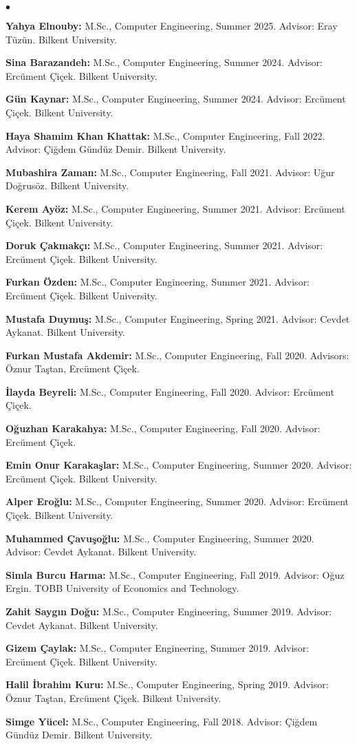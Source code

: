 \documentclass[margin,line]{res}
\newenvironment{list2}{
  \begin{list}{$\bullet$}{%
      \setlength{\itemsep}{0.1cm}
      \setlength{\parsep}{0in} \setlength{\parskip}{0in}
      \setlength{\topsep}{0in} \setlength{\partopsep}{0in} 
      \setlength{\leftmargin}{0.2in}}}{\end{list}}
\begin{document}
\begin{resume}
\begin{list2}
\item
  {\bf Yahya Elnouby:} M.Sc., Computer Engineering, Summer 2025.
  Advisor: Eray Tüzün.
  Bilkent University.

  {\bf Sina Barazandeh:} M.Sc., Computer Engineering, Summer 2024.
  Advisor: Ercüment Çiçek.
  Bilkent University.
\item
  {\bf Gün Kaynar:} M.Sc., Computer Engineering, Summer 2024.
  Advisor: Ercüment Çiçek.
  Bilkent University.
  \item 
  {\bf Haya Shamim Khan Khattak:} M.Sc., Computer Engineering, Fall 2022.
  Advisor: Çiğdem Gündüz Demir.
  Bilkent University.
\item
{\bf Mubashira Zaman:} M.Sc., Computer Engineering, Fall 2021.
  Advisor: Uğur Doğrusöz.
  Bilkent University.
\item
{\bf  Kerem Ayöz:} M.Sc., Computer Engineering, Summer 2021.
  Advisor: Ercüment Çiçek.
  Bilkent University.
\item
{\bf  Doruk Çakmakçı:} M.Sc., Computer Engineering, Summer 2021.
  Advisor: Ercüment Çiçek.
  Bilkent University.
\item
{\bf  Furkan Özden:} M.Sc., Computer Engineering, Summer 2021.
  Advisor: Ercüment Çiçek.
  Bilkent University.
\item
{\bf  Mustafa Duymuş:} M.Sc., Computer Engineering, Spring 2021.
  Advisor: Cevdet Aykanat.
  Bilkent University.
\item 
{\bf Furkan Mustafa Akdemir:} M.Sc., Computer Engineering, Fall 2020.
  Advisors:  Öznur Taştan, Ercüment Çiçek.
\item 
{\bf İlayda Beyreli:} M.Sc., Computer Engineering, Fall 2020.
  Advisor:  Ercüment Çiçek.
\item 
{\bf Oğuzhan Karakahya:} M.Sc., Computer Engineering, Fall 2020.
  Advisor:  Ercüment Çiçek.
\item 
{\bf  Emin Onur Karakaşlar:} M.Sc., Computer Engineering, Summer 2020.
  Advisor:  Ercüment Çiçek.
  Bilkent University.\item 
{\bf  Alper Eroğlu:} M.Sc., Computer Engineering, Summer 2020.
  Advisor:  Ercüment Çiçek.
  Bilkent University.
  \item
{\bf  Muhammed Çavuşoğlu:} M.Sc., Computer Engineering, Summer 2020.
  Advisor: Cevdet Aykanat.
  Bilkent University.
\item
{\bf  Simla Burcu Harma:} M.Sc., Computer Engineering, Fall 2019.
  Advisor: Oğuz Ergin.
  TOBB University of Economics and Technology.
\item
{\bf  Zahit Saygın Doğu:} M.Sc., Computer Engineering, Summer 2019.
  Advisor: Cevdet Aykanat.
  Bilkent University.
  \item
{\bf  Gizem Çaylak:} M.Sc., Computer Engineering, Summer 2019.
  Advisor: Ercüment Çiçek.
  Bilkent University.
\item
{\bf  Halil İbrahim Kuru:} M.Sc., Computer Engineering, Spring 2019.
  Advisor: Öznur Taştan, Ercüment Çiçek.
  Bilkent University.
\item
  {\bf Simge Yücel:} M.Sc., Computer Engineering, Fall 2018.
  Advisor: Çiğdem Gündüz Demir.
  Bilkent University.


\end{list2}
\end{resume}
\end{document}
